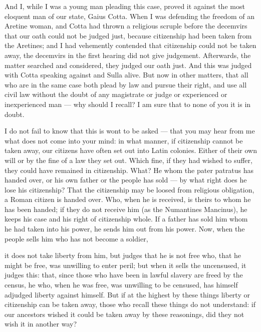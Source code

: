  And I, while I was a young man pleading this case, proved it against the most eloquent man of our state, Gaius Cotta. When I was defending the freedom of an Aretine woman, and Cotta had thrown a religious scruple before the decemvirs that our oath could not be judged just, because citizenship had been taken from the Aretines; and I had vehemently contended that citizenship could not be taken away, the decemvirs in the first hearing did not give judgement. Afterwards, the matter searched and considered, they judged our oath just. And this was judged with Cotta speaking against and Sulla alive. But now in other matters, that all who are in the same case both plead by law and pursue their right, and use all civil law without the doubt of any magistrate or judge or experienced or inexperienced man --- why should I recall? I am sure that to none of you it is in doubt.

 I do not fail to know that this is wont to be asked --- that you may hear from me what does not come into your mind: in what manner, if citizenship cannot be taken away, our citizens have often set out into Latin colonies. Either of their own will or by the fine of a law they set out. Which fine, if they had wished to suffer, they could have remained in citizenship. What? He whom the pater patratus has handed over, or his own father or the people has sold --- by what right does he lose his citizenship? That the citizenship may be loosed from religious obligation, a Roman citizen is handed over. Who, when he is received, is theirs to whom he has been handed; if they do not receive him (as the Numantines Mancinus), he keeps his case and his right of citizenship whole. If a father has sold him whom he had taken into his power, he sends him out from his power. Now, when the people sells him who has not become a soldier,

 it does not take liberty from him, but judges that he is not free who, that he might be free, was unwilling to enter peril; but when it sells the uncensused, it judges this: that, since those who have been in lawful slavery are freed by the census, he who, when he was free, was unwilling to be censused, has himself adjudged liberty against himself. But if at the highest by these things liberty or citizenship can be taken away, those who recall these things do not understand: if our ancestors wished it could be taken away by these reasonings, did they not wish it in another way?

